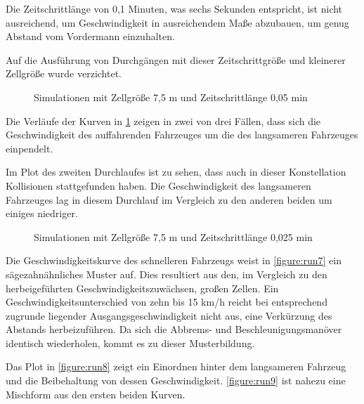 Die Zeitschrittlänge von 0,1 Minuten, was sechs Sekunden entspricht, ist nicht ausreichend, um Geschwindigkeit in ausreichendem Maße abzubauen, um genug Abstand vom Vordermann einzuhalten.

Auf die Ausführung von Durchgängen mit dieser Zeitschrittgröße und kleinerer Zellgröße wurde verzichtet.

\begin{figure}[hptb]
  \centering 
   \qquad 
   \qquad 
  \caption{Simulationen mit Zellgröße 7,5 m und Zeitschrittlänge 0,05 min} 
  \label{figure:run4-6}
\end{figure}

Die Verläufe der Kurven in \cref{figure:run4-6} zeigen in zwei von drei Fällen, dass sich die Geschwindigkeit des auffahrenden Fahrzeuges um die des langsameren Fahrzeuges einpendelt.

Im Plot des zweiten Durchlaufes ist zu sehen, dass auch in dieser Konstellation Kollisionen stattgefunden haben.
Die Geschwindigkeit des langsameren Fahrzeuges lag in diesem Durchlauf im Vergleich zu den anderen beiden um einiges niedriger.

\begin{figure}[hptb]
  \centering 
   \qquad 
   \qquad 
  \caption{Simulationen mit Zellgröße 7,5 m und Zeitschrittlänge 0,025 min} 
  \label{figure:run7-9}
\end{figure}

Die Geschwindigkeitskurve des schnelleren Fahrzeugs weist in \cref{figure:run7} ein sägezahnähnliches Muster auf.
Dies resultiert aus den, im Vergleich zu den herbeigeführten Geschwindigkeitszuwächsen, großen Zellen.
Ein Geschwindigkeitsunterschied von zehn bis 15 km/h reicht bei entsprechend zugrunde liegender Ausgangsgeschwindigkeit nicht aus, eine Verkürzung des Abstands herbeizuführen.
Da sich die Abbrems- und Beschleunigungsmanöver identisch wiederholen, kommt es zu dieser Musterbildung.

Das Plot in \cref{figure:run8} zeigt ein Einordnen hinter dem langsameren Fahrzeug und die Beibehaltung von dessen Geschwindigkeit.
\cref{figure:run9} ist nahezu eine Mischform aus den ersten beiden Kurven.


